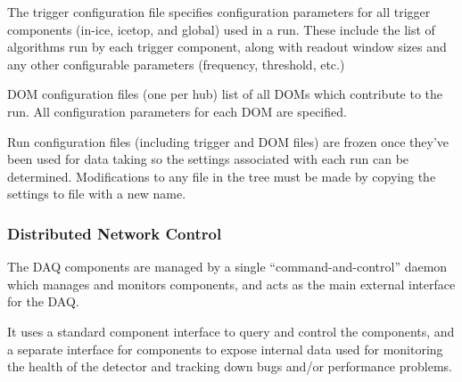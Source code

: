 The trigger configuration file specifies configuration parameters for all
trigger components (in-ice, icetop, and global) used in a run.  These include
the list of algorithms run by each trigger component, along with readout window
sizes and any other configurable parameters (frequency, threshold, etc.)

DOM configuration files (one per hub) list of all DOMs which contribute to the
run.  All configuration parameters for each DOM are specified.

Run configuration files (including trigger and DOM files) are frozen once
they've been used for data taking so the settings associated with each run can
be determined.  Modifications to any file in the tree must be made by copying
the settings to file with a new name.

\subsubsection{Distributed Network Control}


The DAQ components are managed by a single ``command-and-control'' daemon
which manages and monitors components, and acts as the main
external interface for the DAQ.

It uses a standard component interface to query and
control the components, and a separate interface for components to expose
internal data used for monitoring the health of the detector and tracking
down bugs and/or performance problems.


